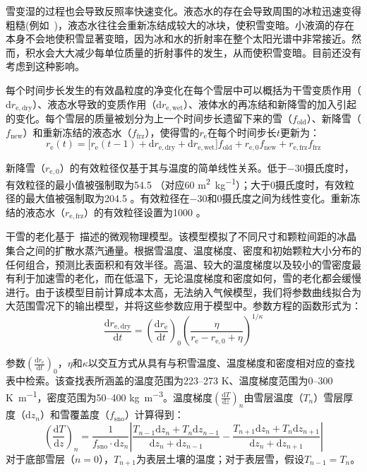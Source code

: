 雪变湿的过程也会导致反照率快速变化。液态水的存在会导致周围的冰粒迅速变得粗糙(例如~\citet{brun1989InvestigationWetSnowMetamorphism})，液态水往往会重新冻结成较大的冰块，使积雪变暗。小液滴的存在本身不会地使积雪显著变暗，因为冰和水的折射率在整个太阳光谱中非常接近。然而，积水会大大减少每单位质量的折射事件的发生，从而使积雪变暗。目前还没有考虑到这种影响。

每个时间步长发生的有效晶粒度的净变化在每个雪层中可以概括为干雪变质作用（${\mathrm d}r_{\mathrm{e,dry}}$）、液态水导致的变质作用（${\mathrm d}r_{\mathrm {e,wet}}$）、液体水的再冻结和新降雪的加入引起的变化。每个雪层的质量被划分为上一个时间步长遗留下来的雪（$f_{\mathrm{old}}$）、新降雪（$f_{\mathrm{new}}$）和重新冻结的液态水（$f_{\mathrm{frz}}$），使得雪的$r_{\mathrm e}$在每个时间步长${t}$更新为：
\begin{equation}
  r_{\mathrm e}(t) = \lbrack r_{\mathrm e}(t - 1) + {{\mathrm d}r}_{\mathrm {e,dry}} + {{\mathrm d}r}_{\mathrm {e,wet}}\rbrack f_{\mathrm{old}} + r_{\mathrm e,0}f_{\mathrm{new}} + r_{\mathrm{e,frz}}f_{\mathrm{frz}}
\end{equation}

新降雪（$r_{\mathrm {e,0}}$）的有效粒径仅基于其与温度的简单线性关系。低于$-30$摄氏度时，有效粒径的最小值被强制取为54.5 \unit{}（对应60 \unit{m^{2}.kg^{-1}}）；大于0摄氏度时，有效粒径的最大值被强制取为204.5 \unit{}。有效粒径在$-30$和0摄氏度之间为线性变化。重新冻结的液态水（$r_{\mathrm {e,frz}}$）的有效粒径设置为1000 \unit{}。

干雪的老化基于~\citet{flanner2006LinkingSnowpackMicrophysics}描述的微观物理模型。该模型模拟了不同尺寸和颗粒间距的冰晶集合之间的扩散水蒸汽通量。根据雪温度、温度梯度、密度和初始颗粒大小分布的任何组合，预测比表面积和有效半径。高温、较大的温度梯度以及较小的雪密度最有利于加速雪的老化，而在低温下，无论温度梯度和密度如何，雪的老化都会缓慢进行。由于该模型目前计算成本太高，无法纳入气候模型，我们将参数曲线拟合为大范围雪况下的输出模型，并将这些参数应用于模型中。参数方程的函数形式为：
\begin{equation}
  \frac{{{\mathrm d}r}_{\mathrm {e,dry}}}{{\mathrm d}t} = \left( \frac{{{\mathrm d}r}_{\mathrm e}}{{\mathrm d}t} \right)_{0}\left( \frac{\eta}{r_{\mathrm e} - r_{\mathrm {e,0}} + \eta} \right)^{1/\kappa}
\end{equation}

参数$\left( \frac{{{\mathrm d}r}_{\mathrm e}}{{\mathrm d}t} \right)_{0}$，$\eta$和$\kappa$以交互方式从具有与积雪温度、温度梯度和密度相对应的查找表中检索。该查找表所涵盖的温度范围为223--273 K、温度梯度范围为0--300 \unit{K.m^{-1}}，密度范围为50--400 \unit{kg.m^{-3}}。温度梯度$\left( \frac{{\mathrm d}T}{{\mathrm d}z} \right)_{n}$由雪层温度（$T_n$）雪层厚度（${\mathrm d}z_n$）和雪覆盖度（$f_{\mathrm{sno}}$）计算得到：
%
\begin{equation}
  \left( \frac{{\mathrm d}T}{{\mathrm d}z} \right)_{n} = \frac{1}{f_{\mathrm{sno}}\cdot {{\mathrm d}z}_{n}}\left| \frac{T_{n - 1}{{\mathrm d}z}_{n} + T_{n}{{\mathrm d}z}_{n - 1}}{{{\mathrm d}z}_{n} + {{\mathrm d}z}_{n - 1}} - \frac{T_{n + 1}{{\mathrm d}z}_{n} + T_{n}{{\mathrm d}z}_{n + 1}}{{{\mathrm d}z}_{n} + {{\mathrm d}z}_{n + 1}} \right|
\end{equation}
%
对于底部雪层（$n=0$），$T_{n+1}$为表层土壤的温度；对于表层雪，假设$T_{n-1}=T_n$。

